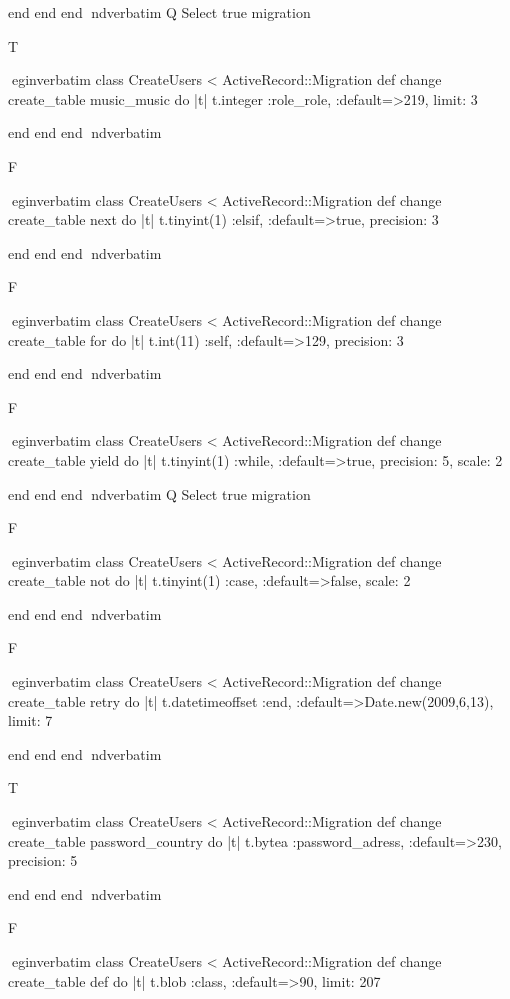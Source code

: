     end 
  end 
end
nd{verbatim}
Q
 Select true migration

T

egin{verbatim}
 class CreateUsers < ActiveRecord::Migration 
  def change 
    create_table music_music do |t| 
      t.integer :role_role, :default=>219, limit: 3
    
    end 
  end 
end
nd{verbatim}

F

egin{verbatim}
 class CreateUsers < ActiveRecord::Migration 
  def change 
    create_table next do |t| 
      t.tinyint(1) :elsif, :default=>true, precision: 3
    
    end 
  end 
end
nd{verbatim}

F

egin{verbatim}
 class CreateUsers < ActiveRecord::Migration 
  def change 
    create_table for do |t| 
      t.int(11) :self, :default=>129, precision: 3
    
    end 
  end 
end
nd{verbatim}

F

egin{verbatim}
 class CreateUsers < ActiveRecord::Migration 
  def change 
    create_table yield do |t| 
      t.tinyint(1) :while, :default=>true, precision: 5, scale: 2
    
    end 
  end 
end
nd{verbatim}
Q
 Select true migration

F

egin{verbatim}
 class CreateUsers < ActiveRecord::Migration 
  def change 
    create_table not do |t| 
      t.tinyint(1) :case, :default=>false, scale: 2
    
    end 
  end 
end
nd{verbatim}

F

egin{verbatim}
 class CreateUsers < ActiveRecord::Migration 
  def change 
    create_table retry do |t| 
      t.datetimeoffset :end, :default=>Date.new(2009,6,13), limit: 7
    
    end 
  end 
end
nd{verbatim}

T

egin{verbatim}
 class CreateUsers < ActiveRecord::Migration 
  def change 
    create_table password_country do |t| 
      t.bytea :password_adress, :default=>230, precision: 5
    
    end 
  end 
end
nd{verbatim}

F

egin{verbatim}
 class CreateUsers < ActiveRecord::Migration 
  def change 
    create_table def do |t| 
      t.blob :class, :default=>90, limit: 207
    
